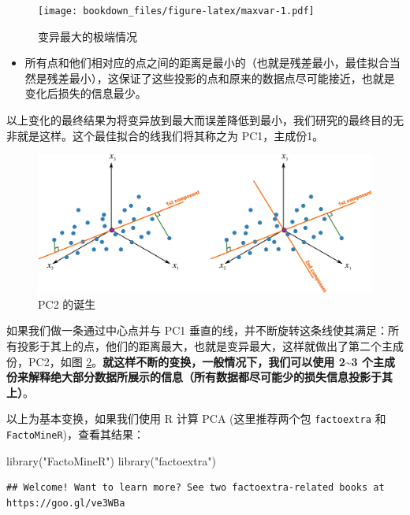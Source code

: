 \documentclass[
]{krantz}
\makeatletter
\newenvironment{Shaded}{\begin{snugshade}}{\end{snugshade}}
\newcommand{\FunctionTok}[1]{\textcolor[rgb]{0.00,0.00,0.00}{#1}}
\newcommand{\NormalTok}[1]{#1}
\newcommand{\StringTok}[1]{\textcolor[rgb]{0.31,0.60,0.02}{#1}}
\providecommand{\tightlist}{%
  \setlength{\itemsep}{0pt}\setlength{\parskip}{0pt}}
\newenvironment{kframe}{%
\medskip{}
\setlength{\fboxsep}{.8em}
 \def\at@end@of@kframe{}%
 \ifinner\ifhmode%
  \def\at@end@of@kframe{\end{minipage}}%
  \begin{minipage}{\columnwidth}%
 \fi\fi%
 \def\FrameCommand##1{\hskip\@totalleftmargin \hskip-\fboxsep
 \colorbox{shadecolor}{##1}\hskip-\fboxsep
     \hskip-\linewidth \hskip-\@totalleftmargin \hskip\columnwidth}%
 \MakeFramed {\advance\hsize-\width
   \@totalleftmargin\z@ \linewidth\hsize
   \@setminipage}}%
 {\par\unskip\endMakeFramed%
 \at@end@of@kframe}
\renewenvironment{Shaded}{\begin{kframe}}{\end{kframe}}
\makeatother
\begin{document}
\begin{figure}
\centering
\texttt{[image: bookdown\_files/figure-latex/maxvar-1.pdf]}
\caption{\label{fig:maxvar}变异最大的极端情况}
\end{figure}

\begin{itemize}
\tightlist
\item
  所有点和他们相对应的点之间的距离是最小的（也就是残差最小，最佳拟合当然是残差最小），这保证了这些投影的点和原来的数据点尽可能接近，也就是变化后损失的信息最少。
\end{itemize}

以上变化的最终结果为将变异放到最大而误差降低到最小，我们研究的最终目的无非就是这样。这个最佳拟合的线我们将其称之为 PC1，主成份1。

\begin{figure}
\includegraphics[width=1\linewidth]{images/pc3} \caption{PC2 的诞生}\label{fig:pc3}
\end{figure}

如果我们做一条通过中心点并与 PC1 垂直的线，并不断旋转这条线使其满足：所有投影于其上的点，他们的距离最大，也就是变异最大，这样就做出了第二个主成份，PC2，如图 \ref{fig:pc3}。\textbf{就这样不断的变换，一般情况下，我们可以使用 2\textasciitilde3 个主成份来解释绝大部分数据所展示的信息（所有数据都尽可能少的损失信息投影于其上）}。

以上为基本变换，如果我们使用 R 计算 PCA (这里推荐两个包 \texttt{factoextra} 和 \texttt{FactoMineR})，查看其结果：

\begin{Shaded}
\begin{Highlighting}[]
\FunctionTok{library}\NormalTok{(}\StringTok{"FactoMineR"}\NormalTok{)}
\FunctionTok{library}\NormalTok{(}\StringTok{"factoextra"}\NormalTok{)}
\end{Highlighting}
\end{Shaded}

\begin{verbatim}
## Welcome! Want to learn more? See two factoextra-related books at https://goo.gl/ve3WBa
\end{verbatim}
\end{document}
